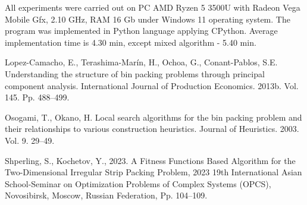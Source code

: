 \documentclass[12pt]{llncs}
\begin{document}
All experiments were carried out on PC AMD Ryzen 5 3500U with Radeon Vega Mobile Gfx, 2.10 GHz, RAM 16 Gb under Windows 11 operating system. The program was implemented in Python language applying CPython. Average implementation time is 4.30 min, except mixed algorithm - 5.40 min.


\begin{thebibliography}{9} %

 Lopez-Camacho, E., Terashima-Marín, H., Ochoa, G., Conant-Pablos, S.E.  Understanding the structure of bin packing problems through principal component analysis. International Journal of Production Economics. 2013b. Vol. 145. Pp. 488--499. 

 Osogami, T., Okano, H.   Local search algorithms for the bin packing problem and their relationships to various construction heuristics. Journal of Heuristics. 2003. Vol. 9. 29--49. 

 Shperling, S., Kochetov, Y., 2023. A Fitness Functions Based Algorithm for the Two-Dimensional Irregular Strip Packing Problem, 2023 19th International Asian School-Seminar on Optimization Problems of Complex Systems (OPCS), Novosibirsk, Moscow, Russian Federation, Pp. 104--109.

\end{thebibliography}
\end{document}
